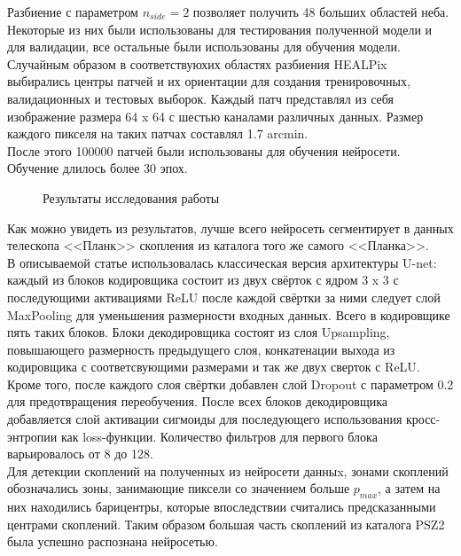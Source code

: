 Разбиение с параметром $n_{side}=2$ позволяет получить 48 больших областей неба. Некоторые из них 
были использованы для тестирования полученной модели и для валидации, все остальные были 
использованы для обучения модели.\\ 

Случайным образом в соответствуюхих областях разбиения HEALPix выбирались центры патчей и их 
ориентации для создания тренировочных, валидационных и тестовых выборок. Каждый патч представлял 
из себя изображение размера 64 x 64 с шестью каналами различных данных. Размер каждого пикселя 
на таких патчах составлял 1.7 arcmin. \\

После этого 100000 патчей были использованы для обучения нейросети. Обучение длилось более 30 эпох. \\ 
\begin{figure}[h!]
	\center{\texttt{[image: sz0]}}
	\caption{Результаты исследования работы \cite{Bonjean}}
\end{figure}

Как можно увидеть из результатов, лучше всего нейросеть сегментирует в данных телескопа <<Планк>> 
скопления из каталога того же самого <<Планка>>.\\

В описываемой статье использовалась классическая версия архитектуры U-net: каждый из блоков 
кодировщика состоит из двух свёрток с ядром 3 x 3 с последующими активациями ReLU после каждой 
свёртки за ними следует слой MaxPooling для уменьшения размерности входных данных. Всего в 
кодировщике пять таких блоков. Блоки декодировщика состоят из слоя Upsampling, повышающего 
размерность предыдущего слоя, конкатенации выхода из кодировщика с соответсвующими размерами и 
так же двух сверток с ReLU. Кроме того, после каждого слоя свёртки добавлен слой Dropout с 
параметром 0.2 для предотвращения переобучения. После всех блоков декодировщика добавляется слой 
активации сигмоиды для последующего использования кросс-энтропии как loss-функции. Количество 
фильтров для первого блока варьировалось от 8 до 128.\\

Для детекции скоплений на полученных из нейросети данныx, зонами скоплений обозначались зоны, 
занимающие пиксели со значением больше $p_{max}$, а затем на них находились барицентры, которые 
впоследствии считались предсказанными центрами скоплений. Таким образом большая часть скоплений из 
каталога PSZ2 была успешно распознана нейросетью. \\

